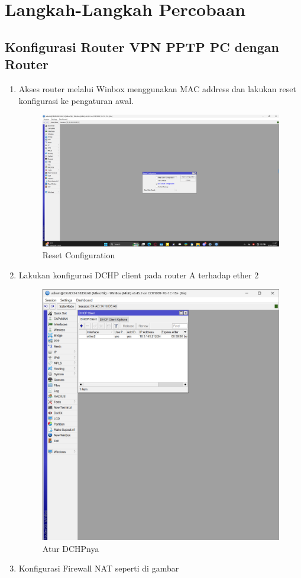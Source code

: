 
\section{Langkah-Langkah Percobaan}
\subsection{Konfigurasi Router VPN PPTP PC dengan Router}

\begin{enumerate}

    \item Akses router melalui Winbox menggunakan MAC address dan lakukan reset konfigurasi ke pengaturan awal.
      \begin{figure}[H]
        \centering
        \includegraphics[width=0.5\linewidth]{P1/img/16.png}
        \caption{Reset Configuration}
        \label{fig:gambar4}
    \end{figure}
    \item Lakukan konfigurasi DCHP client pada router A terhadap ether 2
     \begin{figure}[H]
        \centering
        \includegraphics[width=0.5\linewidth]{P1/img/1.png}
        \caption{Atur DCHPnya}
        \label{fig:gambar4}
    \end{figure}
    \item Konfigurasi Firewall NAT seperti di gambar
     \begin{figure}[H]
        \centering

\end{figure}
\end{enumerate}
